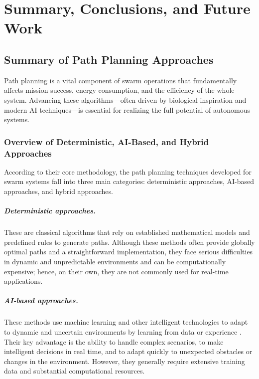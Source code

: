 \chapter{Summary, Conclusions, and Future Work}\label{chap:conclusion}

\section{Summary of Path Planning Approaches}\label{sec:summary}

Path planning is a vital component of swarm operations that fundamentally affects
mission success, energy consumption, and the efficiency of the whole system.
Advancing these algorithms---often driven by biological inspiration and modern AI
techniques---is essential for realizing the full potential of autonomous systems.

\subsection{Overview of Deterministic, AI-Based, and Hybrid Approaches}

According to their core methodology, the path planning techniques developed for
swarm systems fall into three main categories: deterministic approaches, AI-based
approaches, and hybrid approaches.

\paragraph{Deterministic approaches.} These are classical algorithms that rely on
established mathematical models and predefined rules to generate paths. Although
these methods often provide globally optimal paths and a straightforward
implementation, they face serious difficulties in dynamic and unpredictable
environments and can be computationally expensive; hence, on their own, they are
not commonly used for real-time applications.

\paragraph{AI-based approaches.} These methods use machine learning and other
intelligent technologies to adapt to dynamic and uncertain environments by
learning from data or experience \cite{abujabal2024path}. Their key advantage is the ability to
handle complex scenarios, to make intelligent decisions in real time, and to adapt
quickly to unexpected obstacles or changes in the environment. However, they
generally require extensive training data and substantial computational
resources.

